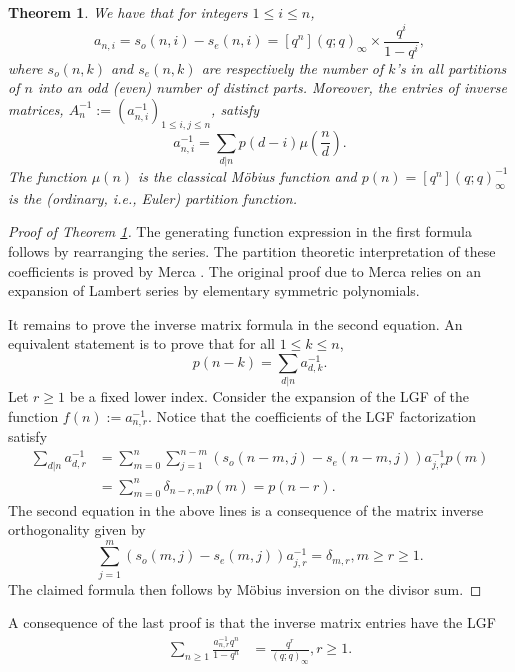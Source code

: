 \documentclass[12pt,reqno,a4letter]{article}
\numberwithin{figure}{section}
\numberwithin{table}{section}
\numberwithin{equation}{section}
\theoremstyle{plain}
\newtheorem{theorem}{Theorem}
\numberwithin{theorem}{section}
\theoremstyle{definition}
\begin{document}
\begin{theorem}
\label{theorem_MainThm_InvMatrixDivSums} 
We have that for integers $1 \leq i \leq n$, 
\[
a_{n,i} = s_o(n, i) - s_e(n, i) = [q^n] (q; q)_{\infty} \times \frac{q^i}{1-q^i}, 
\]
where $s_o(n, k)$ and $s_e(n, k)$ are respectively the number of $k$'s in all 
partitions of $n$ into an odd (even) number of distinct parts. 
Moreover, the entries of inverse matrices, $A_n^{-1} := (a_{n,i}^{-1})_{1 \leq i,j \leq n}$, satisfy
\[
a_{n,i}^{-1} = \sum_{d|n} p(d-i) \mu\left(\frac{n}{d}\right). 
\]
The function $\mu(n)$ is the classical M\"obius function and 
$p(n) = [q^n] (q; q)_{\infty}^{-1}$ is the (ordinary, i.e., Euler) partition function. 
\end{theorem} 
\begin{proof}[Proof of Theorem \ref{theorem_MainThm_InvMatrixDivSums}]
The generating function expression in the first formula follows by rearranging the 
series. The partition theoretic interpretation of these coefficients is proved by 
Merca \cite[Thm.~1.2]{MERCA-LSFACTTHM}. The original proof due to Merca relies on 
an expansion of Lambert series by elementary symmetric polynomials. 

It remains to prove the inverse matrix formula in the second equation. 
An equivalent statement is to prove that 
for all $1 \leq k \leq n$, 
\[
p(n-k) = \sum_{d|n} a_{d,k}^{-1}. 
\]
Let $r \geq 1$ be a fixed lower index. 
Consider the expansion of the LGF of the function $f(n) := a_{n,r}^{-1}$.
Notice that the coefficients of the LGF factorization satisfy 
\begin{align*}
\sum_{d|n} a_{d,r}^{-1} & = \sum_{m=0}^{n} \sum_{j=1}^{n-m} \left( 
     s_o(n-m, j) - s_e(n-m, j)\right) a_{j,r}^{-1} p(m) \\ 
     & = \sum_{m=0}^{n} \delta_{n-r,m} p(m) = p(n-r). 
\end{align*}
The second equation in the above lines is a consequence of the matrix inverse 
orthogonality given by 
\[
\sum_{j=1}^{m} (s_o(m, j) - s_e(m, j)) a_{j,r}^{-1} = \delta_{m,r}, m \geq r \geq 1. 
\]
The claimed formula then follows by M\"obius inversion on the divisor sum. 
\end{proof} 

A consequence of the last proof is that the inverse matrix entries have the LGF
\begin{align*} 
\sum_{n \geq 1} \frac{a_{n,r}^{-1} q^n}{1-q^n} & = \frac{q^r}{(q; q)_{\infty}}, r \geq 1. 
\end{align*} 
\end{document}
